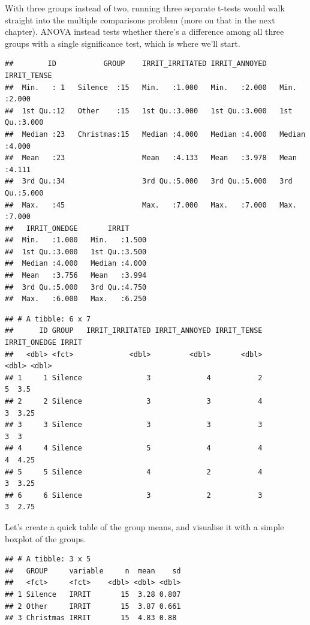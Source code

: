 \documentclass[
]{book}
\begin{document}
With three groups instead of two, running three separate t-tests would walk straight into the multiple comparisons problem (more on that in the next chapter). ANOVA instead tests whether there's a difference among all three groups with a single significance test, which is where we'll start.

\begin{verbatim}
##        ID           GROUP    IRRIT_IRRITATED IRRIT_ANNOYED    IRRIT_TENSE   
##  Min.   : 1   Silence  :15   Min.   :1.000   Min.   :2.000   Min.   :2.000  
##  1st Qu.:12   Other    :15   1st Qu.:3.000   1st Qu.:3.000   1st Qu.:3.000  
##  Median :23   Christmas:15   Median :4.000   Median :4.000   Median :4.000  
##  Mean   :23                  Mean   :4.133   Mean   :3.978   Mean   :4.111  
##  3rd Qu.:34                  3rd Qu.:5.000   3rd Qu.:5.000   3rd Qu.:5.000  
##  Max.   :45                  Max.   :7.000   Max.   :7.000   Max.   :7.000  
##   IRRIT_ONEDGE       IRRIT      
##  Min.   :1.000   Min.   :1.500  
##  1st Qu.:3.000   1st Qu.:3.500  
##  Median :4.000   Median :4.000  
##  Mean   :3.756   Mean   :3.994  
##  3rd Qu.:5.000   3rd Qu.:4.750  
##  Max.   :6.000   Max.   :6.250
\end{verbatim}

\begin{verbatim}
## # A tibble: 6 x 7
##      ID GROUP   IRRIT_IRRITATED IRRIT_ANNOYED IRRIT_TENSE IRRIT_ONEDGE IRRIT
##   <dbl> <fct>             <dbl>         <dbl>       <dbl>        <dbl> <dbl>
## 1     1 Silence               3             4           2            5  3.5 
## 2     2 Silence               3             3           4            3  3.25
## 3     3 Silence               3             3           3            3  3   
## 4     4 Silence               5             4           4            4  4.25
## 5     5 Silence               4             2           4            3  3.25
## 6     6 Silence               3             2           3            3  2.75
\end{verbatim}

Let's create a quick table of the group means, and visualise it with a simple boxplot of the groups.

\begin{verbatim}
## # A tibble: 3 x 5
##   GROUP     variable     n  mean    sd
##   <fct>     <fct>    <dbl> <dbl> <dbl>
## 1 Silence   IRRIT       15  3.28 0.807
## 2 Other     IRRIT       15  3.87 0.661
## 3 Christmas IRRIT       15  4.83 0.88
\end{verbatim}
\end{document}
